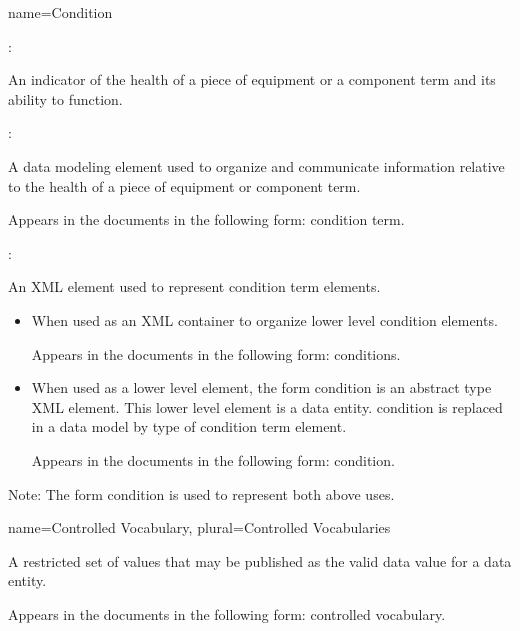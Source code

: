 {
  name={Condition}
}
{
	:

	An indicator of the health of a piece of equipment or a \gls{component term} and its ability to function.

	:

	A data modeling element used to organize and communicate information relative to the health of a piece of equipment or \gls{component term}.

	Appears in the documents in the following form: \gls{condition term}.

	:

	An XML element used to represent \gls{condition term} elements.

    \begin{itemize}
	\item When used as an XML container to organize \gls{lower level} \gls{condition} elements.

	Appears in the documents in the following form: \gls{conditions}.

	\item When used as a \gls{lower level} element, the form \gls{condition} is an abstract type XML element.  This \gls{lower level} element is a \gls{data entity}.  \gls{condition} is replaced in a data model by type of \gls{condition term} element.

	Appears in the documents in the following form: \gls{condition}.
	\end{itemize}

	\begin{note}
	Note: The form \gls{condition} is used to represent both above uses.
	\end{note}
}


{
  name={Controlled Vocabulary},
  plural={Controlled Vocabularies}
}
{
	A restricted set of values that may be published as the \gls{valid data value} for a \gls{data entity}.

	Appears in the documents in the following form: \gls{controlled vocabulary}.
}


